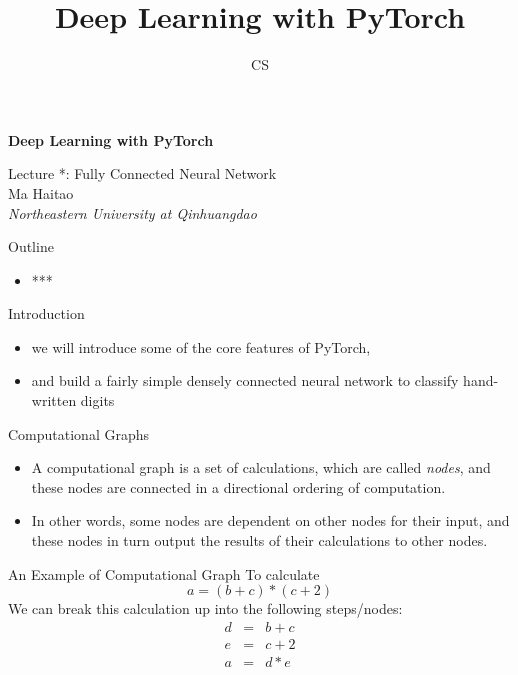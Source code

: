 \documentclass[14 pt]{beamer}
\author[mht]{CS}
\title[Deep Learning with PyTorch]{Deep Learning with PyTorch}
\institute{Northeastern University at Qinhuangdao}
\let\olditem\item
\renewcommand{\item}{\olditem\vspace{4pt}}
\newcommand{\comment}[1]{\textcolor{comment}{\footnotesize{#1}\normalsize}} %
\newcommand{\Comment}[1]{\textcolor{Comment}{\footnotesize{#1}\normalsize}} %
\newcommand{\COMMENT}[1]{\textcolor{COMMENT}{\footnotesize{#1}\normalsize}} %
\begin{document}
\begin{frame}[c]
\begin{center}
	\textcolor{normal text.fg!50!Comment}{\textbf{\Large{Deep Learning with PyTorch}}}
	\vspace{4em}

    \COMMENT{\large{Lecture *: Fully Connected Neural Network}} \\
\vspace{4em}
    \Comment{{Ma Haitao}} \\
\comment{\textit{Northeastern University at Qinhuangdao}}\\
\end{center}
\end{frame}

\begin{frame}{Outline}
  \begin{itemize}
  \item ***
  \end{itemize}
\end{frame}

\begin{frame}{Introduction}
  \begin{itemize}
  \item we will introduce some of the core
    features of PyTorch, 
  \item and build a fairly simple densely connected neural network to classify hand-written digits
  \end{itemize}
\end{frame}

\begin{frame}{Computational Graphs}
  \begin{itemize}
  \item A computational graph is a set of calculations, which are called
    \emph{nodes}, and these nodes are connected in a directional ordering of
    computation. 
  \item In other words, some nodes are dependent on other nodes for their
    input, and these nodes in turn output the results of their calculations
    to other nodes.
  \end{itemize}
\end{frame}

\begin{frame}{An Example of Computational Graph}
To calculate
  \begin{displaymath}
    a = (b + c) * (c + 2)
  \end{displaymath}
We can break this calculation up into the following steps/nodes:
\begin{displaymath}
  \begin{array}{lll}
    d & = & b + c \\
    e & = & c + 2 \\
    a & = & d * e    
  \end{array}
\end{displaymath}
\end{frame}
\end{document}
